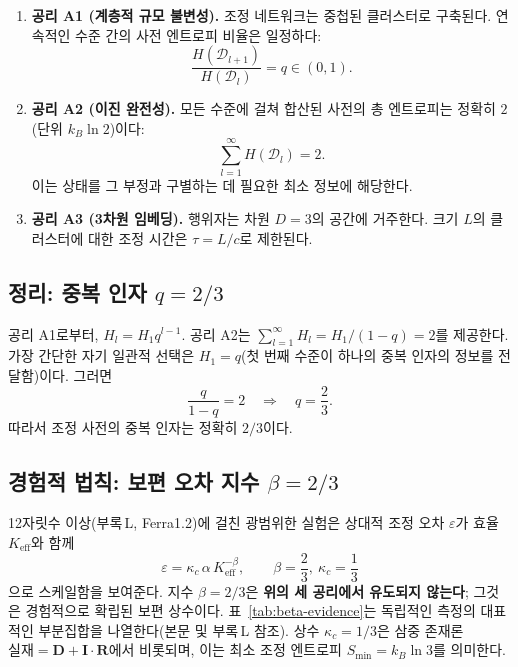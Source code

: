 \documentclass[11pt,a4paper]{article}
\begin{document}
	\begin{enumerate}
		\item \textbf{공리 A1 (계층적 규모 불변성).} 조정 네트워크는 중첩된 클러스터로 구축된다. 연속적인 수준 간의 사전 엔트로피 비율은 일정하다:
		\[
		\frac{H(\mathcal{D}_{l+1})}{H(\mathcal{D}_l)} = q \in (0,1).
		\]
		
		\item \textbf{공리 A2 (이진 완전성).} 모든 수준에 걸쳐 합산된 사전의 총 엔트로피는 정확히 \(2\)(단위 \(k_B\ln 2\))이다:
		\[
		\sum_{l=1}^{\infty} H(\mathcal{D}_l) = 2.
		\]
		이는 상태를 그 부정과 구별하는 데 필요한 최소 정보에 해당한다.
		
		\item \textbf{공리 A3 (3차원 임베딩).} 행위자는 차원 \(D=3\)의 공간에 거주한다. 크기 \(L\)의 클러스터에 대한 조정 시간은 \(\tau = L/c\)로 제한된다.
	\end{enumerate}
	
	\subsection{정리: 중복 인자 \(q = 2/3\)}
	
	공리 A1로부터, \(H_l = H_1 q^{l-1}\). 공리 A2는 \(\sum_{l=1}^\infty H_l = H_1/(1-q) = 2\)를 제공한다. 가장 간단한 자기 일관적 선택은 \(H_1 = q\)(첫 번째 수준이 하나의 중복 인자의 정보를 전달함)이다. 그러면
	\[
	\frac{q}{1-q} = 2 \quad\Longrightarrow\quad \boxed{q = \frac{2}{3}}.
	\]
	따라서 조정 사전의 중복 인자는 정확히 \(2/3\)이다.
	
	\subsection{경험적 법칙: 보편 오차 지수 \(\beta = 2/3\)}
	
	12자릿수 이상(부록 L, Ferra1.2)에 걸친 광범위한 실험은 상대적 조정 오차 \(\varepsilon\)가 효율 \(K_{\mathrm{eff}}\)와 함께
	\[
	\varepsilon = \kappa_c \, \alpha \, K_{\mathrm{eff}}^{-\beta}, \qquad \boxed{\beta = \frac{2}{3}},\ \kappa_c = \frac{1}{3}
	\]
	으로 스케일함을 보여준다. 지수 \(\beta = 2/3\)은 \textbf{위의 세 공리에서 유도되지 않는다}; 그것은 경험적으로 확립된 보편 상수이다. 표~\ref{tab:beta-evidence}는 독립적인 측정의 대표적인 부분집합을 나열한다(본문 및 부록 L 참조). 상수 \(\kappa_c = 1/3\)은 삼중 존재론 \(\text{실재} = \mathbf{D} + \mathbf{I}\!\cdot\!\mathbf{R}\)에서 비롯되며, 이는 최소 조정 엔트로피 \(S_{\min}=k_B\ln 3\)를 의미한다.
	
\end{document}
